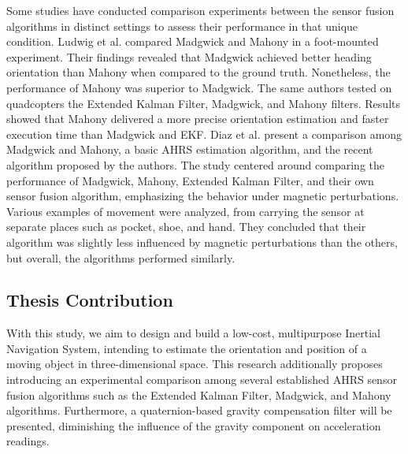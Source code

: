 Some studies have conducted comparison experiments between the sensor fusion algorithms in distinct settings to assess their performance in that unique condition. Ludwig et al. \cite{ludwig2018comparison} compared Madgwick and Mahony in a foot-mounted experiment. Their findings revealed that Madgwick achieved better heading orientation than Mahony when compared to the ground truth. Nonetheless, the performance of Mahony was superior to Madgwick. The same authors tested on \cite{ludwig2018comparisonuav} quadcopters the Extended Kalman Filter, Madgwick, and Mahony filters. Results showed that Mahony delivered a more precise orientation estimation and faster execution time than Madgwick and EKF. Diaz et al. \cite{diaz2015evaluation} present a comparison among Madgwick and Mahony, a basic AHRS estimation algorithm, and the recent algorithm proposed by the authors. The study centered around comparing the performance of Madgwick, Mahony, Extended Kalman Filter, and their own sensor fusion algorithm, emphasizing the behavior under magnetic perturbations. Various examples of movement were analyzed, from carrying the sensor at separate places such as pocket, shoe, and hand. They concluded that their algorithm was slightly less influenced by magnetic perturbations than the others, but overall, the algorithms performed similarly.



\subsection{Thesis Contribution}

With this study, we aim to design and build a low-cost, multipurpose Inertial Navigation System, intending to estimate the orientation and position of a moving object in three-dimensional space. This research additionally proposes introducing an experimental comparison among several established AHRS sensor fusion algorithms such as the Extended Kalman Filter, Madgwick, and Mahony algorithms. Furthermore, a quaternion-based gravity compensation filter will be presented, diminishing the influence of the gravity component on acceleration readings.
